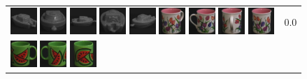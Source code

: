 \begin{figure}[tbp]
\begin{center}
\begin{tabular}{m{11cm} | m{3cm} |}
\includegraphics[width=1cm]{coil/beeld-25.eps}
\includegraphics[width=1cm]{coil/beeld-28.eps}
\includegraphics[width=1cm]{coil/beeld-27.eps}
\includegraphics[width=1cm]{coil/beeld-26.eps}
\includegraphics[width=1cm]{coil/beeld-29.eps}
\includegraphics[width=1cm]{coil/beeld-9.eps}
\includegraphics[width=1cm]{coil/beeld-7.eps}
\includegraphics[width=1cm]{coil/beeld-11.eps}
\includegraphics[width=1cm]{coil/beeld-8.eps}
& {\scriptsize 0.0}
\\
\includegraphics[width=1cm]{coil/beeld-30.eps}
\includegraphics[width=1cm]{coil/beeld-31.eps}
\includegraphics[width=1cm]{coil/beeld-32.eps}

\end{tabular}
\end{center}
\end{figure}
